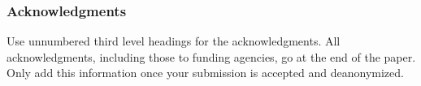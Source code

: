 \documentclass[10pt]{article} %
\theoremstyle{plain}
\theoremstyle{definition}
\theoremstyle{remark}
\begin{document}
\subsubsection*{Acknowledgments}
Use unnumbered third level headings for the acknowledgments. All
acknowledgments, including those to funding agencies, go at the end of the paper.
Only add this information once your submission is accepted and deanonymized. 




\appendix




\end{document}
